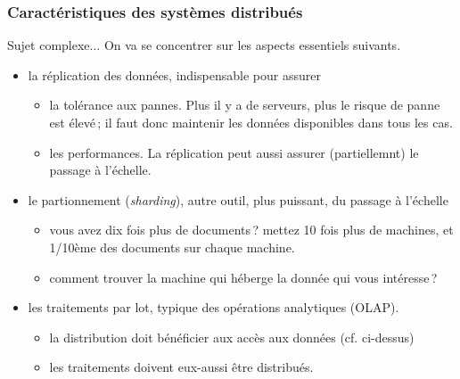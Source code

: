 \begin{frame}
\frametitle{Caractéristiques des systèmes distribués}

Sujet complexe... On va se concentrer sur les aspects essentiels suivants.

\begin{itemize}
  \item la \alert{réplication des données}, indispensable pour assurer
     
  \begin{itemize}
    \item  la \alert{tolérance aux pannes}. Plus il y a de serveurs, plus le risque de panne est élevé\,;
         il faut donc maintenir les données disponibles dans tous les cas.
     \item les \alert{performances}. La réplication peut \alert{aussi} assurer 
      (partiellemnt) le passage à l'échelle.
  \end{itemize}
 
 \item le \alert{partionnement} (\textit{sharding}), autre outil, plus puissant, du passage à l'échelle
  \begin{itemize}
    \item  vous avez dix fois plus de documents\,? mettez 10 fois plus de machines, et 1/10ème des
        documents sur chaque machine.
     \item comment trouver la machine qui héberge la donnée qui vous intéresse\,?
  \end{itemize}

\item les \alert{traitements par lot}, typique des opérations analytiques (OLAP).
  \begin{itemize}
    \item  la distribution doit bénéficier aux \alert{accès aux données} (cf. ci-dessus)
     \item les \alert{traitements} doivent eux-aussi être distribués.
  \end{itemize}
   
\end{itemize}
\end{frame}


